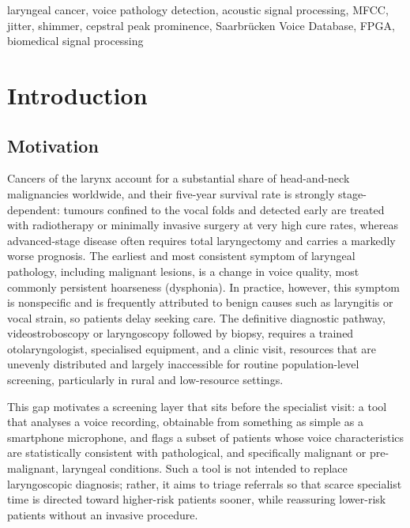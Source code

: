 \documentclass[conference]{IEEEtran}
\begin{document}
\begin{IEEEkeywords}
laryngeal cancer, voice pathology detection, acoustic signal processing, MFCC, jitter, shimmer, cepstral peak prominence, Saarbr\"ucken Voice Database, FPGA, biomedical signal processing
\end{IEEEkeywords}

\section{Introduction}

\subsection{Motivation}
Cancers of the larynx account for a substantial share of head-and-neck malignancies worldwide, and their five-year survival rate is strongly stage-dependent: tumours confined to the vocal folds and detected early are treated with radiotherapy or minimally invasive surgery at very high cure rates, whereas advanced-stage disease often requires total laryngectomy and carries a markedly worse prognosis. The earliest and most consistent symptom of laryngeal pathology, including malignant lesions, is a change in voice quality, most commonly persistent hoarseness (dysphonia). In practice, however, this symptom is nonspecific and is frequently attributed to benign causes such as laryngitis or vocal strain, so patients delay seeking care. The definitive diagnostic pathway, videostroboscopy or laryngoscopy followed by biopsy, requires a trained otolaryngologist, specialised equipment, and a clinic visit, resources that are unevenly distributed and largely inaccessible for routine population-level screening, particularly in rural and low-resource settings.

This gap motivates a screening layer that sits before the specialist visit: a tool that analyses a voice recording, obtainable from something as simple as a smartphone microphone, and flags a subset of patients whose voice characteristics are statistically consistent with pathological, and specifically malignant or pre-malignant, laryngeal conditions. Such a tool is not intended to replace laryngoscopic diagnosis; rather, it aims to triage referrals so that scarce specialist time is directed toward higher-risk patients sooner, while reassuring lower-risk patients without an invasive procedure.
\end{document}
